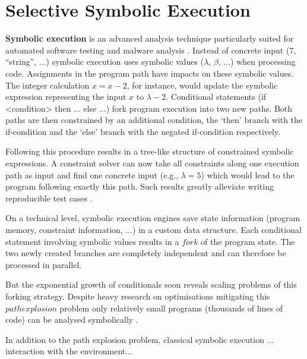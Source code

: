\section{Selective Symbolic Execution}\label{sec:s2e}

\textbf{Symbolic execution} is an advanced analysis technique particularly suited for automated software testing  and malware analysis .
Instead of concrete input (7, ``string'', ...) symbolic execution uses symbolic values ($\lambda$, $\beta$, ...) when processing code.
Assignments in the program path have impacts on these symbolic values.
The integer calculation $x = x - 2$, for instance, would update the symbolic expression representing the input $x$ to $\lambda - 2$.
Conditional statements (if <condition> then ... else ...) fork program execution into two new paths.
Both paths are then constrained by an additional condition, the `then' branch with the if-condition and the `else' branch with the negated if-condition respectively.

Following this procedure results in a tree-like structure of constrained symbolic expressions.
A constraint solver can now take all constraints along one execution path as input and find one concrete input (e.g., $\lambda = 5$) which would lead to the program following exactly this path.
Such results greatly alleviate writing reproducible test cases .

On a technical level, symbolic execution engines save state information (program memory, constraint information, ...) in a custom data structure.
Each conditional statement involving symbolic values results in a $fork$ of the program state.
The two newly created branches are completely independent and can therefore be processed in parallel.

But the exponential growth of conditionals soon reveals scaling problems of this forking strategy.
Despite heavy research on optimisations mitigating this $path explosion$ problem  only relatively small programs (thousands of lines of code) can be analysed symbolically .

In addition to the path explosion problem, classical symbolic execution ... interaction with the environment...

\iffalse
§2	Selective Symbolic Execution
		> Theorie-Teil
		> Was ist Symbolic Execution?
		> Was kann Selective Symbolic Execution besser?
			(Concrete -> symbolic transition usw.)
		> Konsistenzmodelle (wird hier evtl. schwierig, das richtige Maß 
			zu finden, um die Sache auf wenig Platz zu verstehen)
\fi
